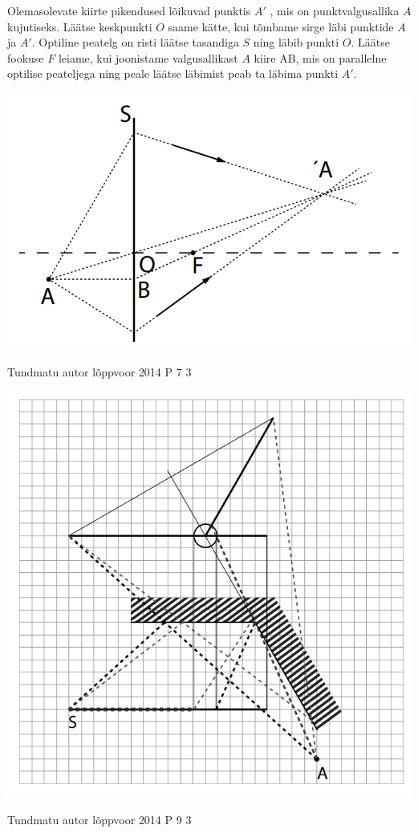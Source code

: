 \documentclass[11pt]{article}
\begin{document}
{{\ifSolution
Olemasolevate kiirte pikendused lõikuvad punktis $A'$ , mis on punktvalgusallika $A$ kujutiseks. Läätse keskpunkti $O$ saame kätte, kui tõmbame sirge läbi punktide $A$ ja $A'$. Optiline peatelg on risti läätse tasandiga $S$ ning läbib punkti $O$. Läätse fookuse $F$ leiame, kui joonistame valgusallikast $A$ kiire AB, mis on parallelne optilise peateljega ning peale läätse läbimist peab ta läbima punkti $A'$.
\begin{center}
	\includegraphics[width=0.5\linewidth]{2014-v2p-10-lah.PNG}
\end{center}
\fi
}


{Tundmatu autor} %
{lõppvoor} %
{2014} %
{P 7} %
{3} %
{

\ifSolution
\begin{center}
	\includegraphics[width=0.5\linewidth]{2014-v3p-07-lah.PNG}
\end{center}
\fi
}


{Tundmatu autor} %
{lõppvoor} %
{2014} %
{P 9} %
{3} %
{

}}
\end{document}
